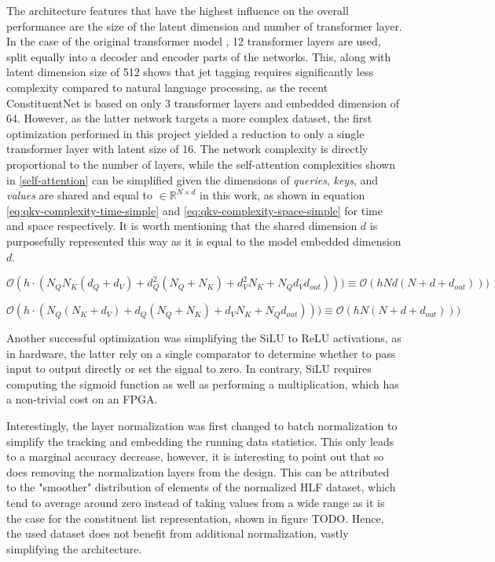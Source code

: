 The architecture features that have the highest influence on the overall performance are the size of the latent dimension and number of transformer layer. In the case of the original transformer model \cite{44-vaswani2017attention}, 12 transformer layers are used, split equally into a decoder and encoder parts of the networks. This, along with latent dimension size of 512 shows that jet tagging requires significantly less complexity compared to natural language processing, as the recent ConstituentNet \cite{3-yuan2021constituentnet:} is based on only 3 transformer layers and embedded dimension of 64. However, as the latter network targets a more complex dataset, the first optimization performed in this project yielded a reduction to only a single transformer layer with latent size of 16. The network complexity is directly proportional to the number of layers, while the self-attention complexities shown in \cref{self-attention} can be simplified given the dimensions of \textit{queries}, \textit{keys}, and \textit{values} are shared and equal to \(\in \mathbb{R}^{N \times d}\) in this work, 
as shown in equation \ref{eq:qkv-complexity-time-simple} and \ref{eq:qkv-complexity-space-simple} for time and space respectively. It is worth mentioning that the shared dimension \(d\) is purposefully represented this way as it is equal to the model embedded dimension \(d\).

\begin{equation}\label{eq:qkv-complexity-time-simple}
  \mathcal{O}(h \cdot (N_Q N_K (d_Q + d_V) + d_Q^2 (N_Q + N_K) + d_V^2 N_K + N_Q d_V d_{out}) )) \equiv
  \mathcal{O}(h N d (N + d + d_{out}) ))
\end{equation}

\begin{equation}\label{eq:qkv-complexity-space-simple}
  \mathcal{O}(h \cdot (N_Q (N_K + d_V) + d_Q (N_Q + N_K) + d_V N_K + N_Q d_{out}) )) \equiv
  \mathcal{O}(h N (N + d + d_{out}) ))
\end{equation}

Another successful optimization was simplifying the SiLU to ReLU activations, as in hardware, the latter rely on a single comparator to determine whether to pass input to output directly or set the signal to zero. In contrary, SiLU requires computing the sigmoid function as well as performing a multiplication, which has a non-trivial cost on an FPGA.

Interestingly, the layer normalization was first changed to batch normalization to simplify the tracking and embedding the running data statistics. This only leads to a marginal accuracy decrease, however, it is interesting to point out that so does removing the normalization layers from the design. This can be attributed to the "smoother" distribution of elements of the normalized HLF dataset, which tend to average around zero instead of taking values from a wide range as it is the case for the constituent list representation, shown in figure TODO. Hence, the used dataset does not benefit from additional normalization, vastly simplifying the architecture.

